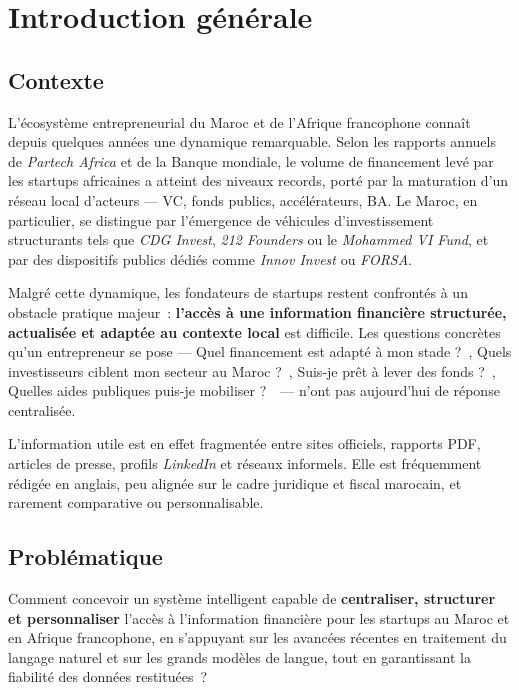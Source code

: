 \chapter*{Introduction générale}

\section*{Contexte}

L'écosystème entrepreneurial du Maroc et de l'Afrique francophone connaît depuis quelques années une dynamique remarquable. Selon les rapports annuels de \textit{Partech Africa} et de la Banque mondiale, le volume de financement levé par les startups africaines a atteint des niveaux records, porté par la maturation d'un réseau local d'acteurs --- \ac{VC}, fonds publics, accélérateurs, \ac{BA}. Le Maroc, en particulier, se distingue par l'émergence de véhicules d'investissement structurants tels que \textit{CDG Invest}, \textit{212 Founders} ou le \textit{Mohammed VI Fund}, et par des dispositifs publics dédiés comme \textit{Innov Invest} ou \textit{FORSA}.

Malgré cette dynamique, les fondateurs de startups restent confrontés à un obstacle pratique majeur~: \textbf{l'accès à une information financière structurée, actualisée et adaptée au contexte local} est difficile. Les questions concrètes qu'un entrepreneur se pose --- \og Quel financement est adapté à mon stade ?~\fg, \og Quels investisseurs ciblent mon secteur au Maroc ?~\fg, \og Suis-je prêt à lever des fonds ?~\fg, \og Quelles aides publiques puis-je mobiliser ?~\fg~--- n'ont pas aujourd'hui de réponse centralisée.

L'information utile est en effet fragmentée entre sites officiels, rapports \ac{PDF}, articles de presse, profils \textit{LinkedIn} et réseaux informels. Elle est fréquemment rédigée en anglais, peu alignée sur le cadre juridique et fiscal marocain, et rarement comparative ou personnalisable.

\section*{Problématique}

Comment concevoir un système intelligent capable de \textbf{centraliser, structurer et personnaliser} l'accès à l'information financière pour les startups au Maroc et en Afrique francophone, en s'appuyant sur les avancées récentes en traitement du langage naturel et sur les grands modèles de langue, tout en garantissant la fiabilité des données restituées~?


